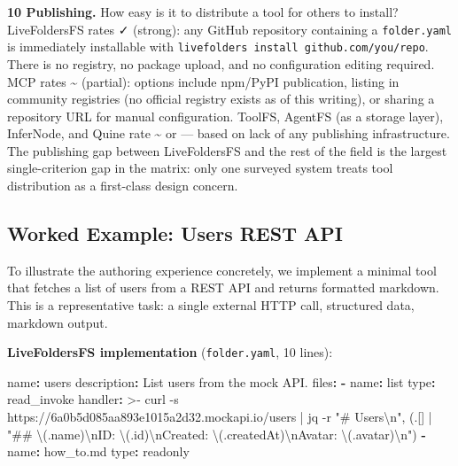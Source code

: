 \documentclass[
  11pt,
]{article}
\newenvironment{Shaded}{}{}
\newcommand{\AttributeTok}[1]{\textcolor[rgb]{0.49,0.56,0.16}{#1}}
\newcommand{\CharTok}[1]{\textcolor[rgb]{0.25,0.44,0.63}{#1}}
\newcommand{\FunctionTok}[1]{\textcolor[rgb]{0.02,0.16,0.49}{#1}}
\newcommand{\KeywordTok}[1]{\textcolor[rgb]{0.00,0.44,0.13}{\textbf{#1}}}
\newcommand{\NormalTok}[1]{#1}
\begin{document}
\textbf{10 Publishing.} How easy is it to distribute a tool for others
to install? LiveFoldersFS rates ✓ (strong): any GitHub repository
containing a \texttt{folder.yaml} is immediately installable with
\texttt{livefolders\ install\ github.com/you/repo}. There is no
registry, no package upload, and no configuration editing required. MCP
rates \textasciitilde{} (partial): options include npm/PyPI publication,
listing in community registries (no official registry exists as of this
writing), or sharing a repository URL for manual configuration. ToolFS,
AgentFS (as a storage layer), InferNode, and Quine rate
\textasciitilde{} or --- based on lack of any publishing infrastructure.
The publishing gap between LiveFoldersFS and the rest of the field is
the largest single-criterion gap in the matrix: only one surveyed system
treats tool distribution as a first-class design concern.

\hypertarget{worked-example-users-rest-api}{%
\subsection{Worked Example: Users REST
API}\label{worked-example-users-rest-api}}

To illustrate the authoring experience concretely, we implement a
minimal tool that fetches a list of users from a REST API and returns
formatted markdown. This is a representative task: a single external
HTTP call, structured data, markdown output.

\textbf{LiveFoldersFS implementation} (\texttt{folder.yaml}, 10 lines):

\begin{Shaded}
\begin{Highlighting}[]
\FunctionTok{name}\KeywordTok{:}\AttributeTok{ users}
\FunctionTok{description}\KeywordTok{:}\AttributeTok{ List users from the mock API.}
\FunctionTok{files}\KeywordTok{:}
\AttributeTok{  }\KeywordTok{{-}}\AttributeTok{ }\FunctionTok{name}\KeywordTok{:}\AttributeTok{ list}
\AttributeTok{    }\FunctionTok{type}\KeywordTok{:}\AttributeTok{ read\_invoke}
\FunctionTok{    handler}\KeywordTok{: }\CharTok{\textgreater{}{-}}
\NormalTok{      curl {-}s https://6a0b5d085aa893e1015a2d32.mockapi.io/users}
\NormalTok{      | jq {-}r \textquotesingle{}"\# Users\textbackslash{}n", (.[] | "\#\# \textbackslash{}(.name)\textbackslash{}nID: \textbackslash{}(.id)\textbackslash{}nCreated: \textbackslash{}(.createdAt)\textbackslash{}nAvatar: \textbackslash{}(.avatar)\textbackslash{}n")\textquotesingle{}}
\AttributeTok{  }\KeywordTok{{-}}\AttributeTok{ }\FunctionTok{name}\KeywordTok{:}\AttributeTok{ how\_to.md}
\AttributeTok{    }\FunctionTok{type}\KeywordTok{:}\AttributeTok{ readonly}
\end{Highlighting}
\end{Shaded}
\end{document}
